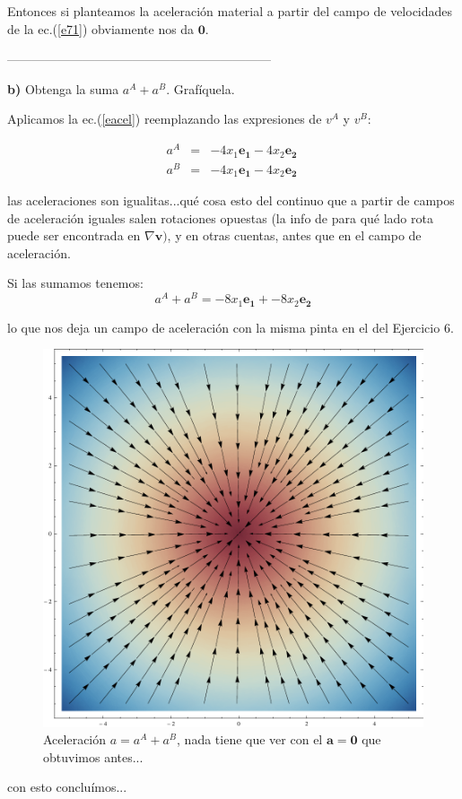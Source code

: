 \documentclass[10pt,a4paper]{article}
\theoremstyle{definition}
\begin{document}
Entonces si planteamos la aceleración material a partir del campo de velocidades de la ec.(\ref{e71}) obviamente nos da $\mathbf{0}$.

---------------------------------------------------------------
\vspace{1cm}

\textbf{b)} Obtenga la suma $a^A + a^B$. Grafíquela.

Aplicamos la ec.(\ref{eacel}) reemplazando las expresiones de $v^A$ y $v^B$:

\begin{eqnarray}
a^A & = &-4x_1\mathbf{e_1} - 4x_2\mathbf{e_2} \label{aA}\\
a^B & = &-4x_1\mathbf{e_1} - 4x_2\mathbf{e_2} \label{aB} \
\end{eqnarray}

\noindent las aceleraciones son igualitas...qué cosa esto del continuo que a partir de campos de aceleración iguales salen rotaciones opuestas (la info de para qué lado rota puede ser encontrada en $\nabla \mathbf{v})$, y en otras cuentas, antes que en el campo de aceleración.

Si las sumamos tenemos:
\begin{equation}
a^A + a^B = -8x_1\mathbf{e_1} + -8x_2\mathbf{e_2} \label{easum}
\end{equation}

\noindent lo que nos deja un campo de aceleración con la misma pinta en el del Ejercicio 6.

\begin{figure}[h!]
\centering
\includegraphics[width=0.5\linewidth]{acel7aplusb.pdf}
  \caption{Aceleración $a = a^A + a^B$, nada tiene que ver con el $\mathbf{a} = \mathbf{0}$ que obtuvimos antes...}
  \label{gae7}
\end{figure}


\noindent con esto concluímos...
\end{document}
